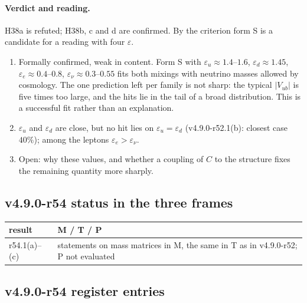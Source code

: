 \paragraph{Verdict and reading.}
H38a is refuted; H38b, c and d are confirmed.  By the criterion form S is a candidate for a reading with four \(\varepsilon\).
\begin{enumerate}[leftmargin=2em]
\item Formally confirmed, weak in content.  Form S with \(\varepsilon_u\approx1.4\)--\(1.6\), \(\varepsilon_d\approx1.45\), \(\varepsilon_e\approx0.4\)--\(0.8\),
\(\varepsilon_\nu\approx0.3\)--\(0.55\) fits both mixings with neutrino masses allowed by cosmology.  The one prediction left per family is not sharp: the
typical \(|V_{ub}|\) is five times too large, and the hits lie in the tail of a broad distribution.  This is a successful fit rather than an
explanation.
\item \(\varepsilon_u\) and \(\varepsilon_d\) are close, but no hit lies on \(\varepsilon_u=\varepsilon_d\) (v4.9.0-r52.1(b): closest case \(40\%\)); among
the leptons \(\varepsilon_e>\varepsilon_\nu\).
\item Open: why these values, and whether a coupling of \(C\) to the structure fixes the remaining quantity more sharply.
\end{enumerate}

\subsection*{v4.9.0-r54 status in the three frames}
\label{subsec:v490-r54-frames}

\begin{center}
\small
\begin{tabular}{@{}>{\raggedright\arraybackslash}p{}>{\raggedright\arraybackslash}p{}@{}}
\toprule
result & M / T / P\\
\midrule
r54.1(a)--(c) & statements on mass matrices in M, the same in T as in v4.9.0-r52; P not evaluated\\
\bottomrule
\end{tabular}
\end{center}

\subsection*{v4.9.0-r54 register entries}
\label{subsec:v490-r54-register}

